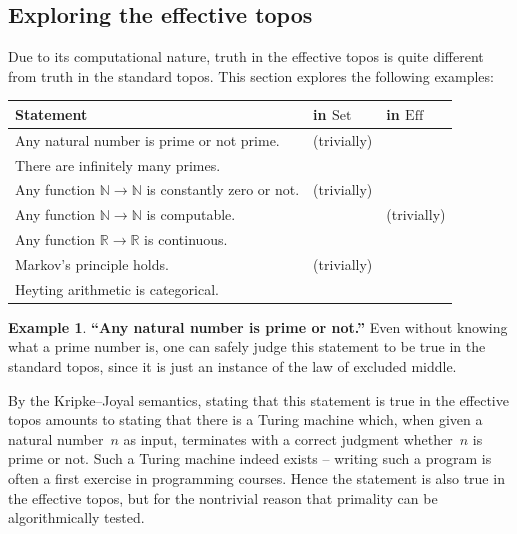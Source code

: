 \documentclass[oneside,reqno]{amsart}
\newcommand{\cmark}{\ding{51}}
\newcommand{\xmark}{\ding{55}}
\theoremstyle{definition}
\newtheorem{ex}[defn]{Example}
\theoremstyle{plain}
\theoremstyle{remark}
\newcommand{\NN}{\mathbb{N}}
\newcommand{\RR}{\mathbb{R}}
\newcommand{\Set}{\mathrm{Set}}
\newcommand{\Eff}{\mathrm{Ef{}f}}
\renewcommand{\_}{\mathpunct{.}\,}
\newcommand{\effective}{ef{}fective\xspace}
\newcommand{\?}{\,{:}\,}
\begin{document}


\subsection{Exploring the \effective topos}
\label{sect:eff-examples}
Due to its computational nature, truth in the \effective topos is quite
different from truth in the standard topos. This section explores the following
examples:

\bigskip
\begin{center}
\begin{tabular}{lll}
  \toprule
  Statement & in $\Set$ & in $\Eff$ \\
  \midrule
  Any natural number is prime or not prime. & \cmark{} (trivially) & \cmark \\
  There are infinitely many primes. & \cmark & \cmark \\
  Any function $\NN \to \NN$ is constantly zero or not. & \cmark{} (trivially) & \xmark \\
  Any function $\NN \to \NN$ is computable. & \xmark & \cmark{} (trivially) \\
  Any function $\RR \to \RR$ is continuous. & \xmark & \cmark \\
  Markov's principle holds. & \cmark{} (trivially) & \cmark \\
  Heyting arithmetic is categorical. & \xmark & \cmark \\
  \bottomrule
\end{tabular}
\end{center}
\bigskip

\newcommand{\dotparagraph}[1]{\noindent\textbf{#1}}

\begin{ex}\textbf{``Any natural number is prime or not.''} Even without knowing what
a prime number is, one can safely judge this statement to be true in
the standard topos, since it is just an instance of the law of excluded middle.

By the Kripke--Joyal semantics, stating that this statement is true in the \effective topos
amounts to stating that there is a Turing machine which, when given a natural
number~$n$ as input, terminates with a correct judgment whether~$n$ is prime or
not. Such a Turing machine indeed exists -- writing such a program is often a
first exercise in programming courses. Hence the statement is also true in the
\effective topos, but for the nontrivial reason that primality can be
algorithmically tested.
\end{ex}
\end{document}
